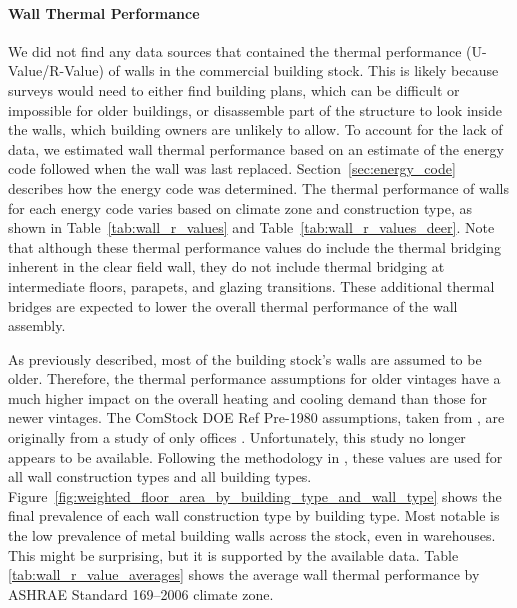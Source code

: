 \paragraph{Wall Thermal Performance}
We did not find any data sources that contained the thermal performance (U-Value/R-Value) of walls in the commercial building stock. This is likely because surveys would need to either find building plans, which can be difficult or impossible for older buildings, or disassemble part of the structure to look inside the walls, which building owners are unlikely to allow. To account for the lack of data, we estimated wall thermal performance based on an estimate of the energy code followed when the wall was last replaced. Section~\ref{sec:energy_code} describes how the energy code was determined. The thermal performance of walls for each energy code varies based on climate zone and construction type, as shown in Table~\ref{tab:wall_r_values} and Table~\ref{tab:wall_r_values_deer}. Note that although these thermal performance values do include the thermal bridging inherent in the clear field wall, they do not include thermal bridging at intermediate floors, parapets, and glazing transitions. These additional thermal bridges are expected to lower the overall thermal performance of the wall assembly.

As previously described, most of the building stock's walls are assumed to be older. Therefore, the thermal performance assumptions for older vintages have a much higher impact on the overall heating and cooling demand than those for newer vintages. The ComStock DOE Ref Pre-1980 assumptions, taken from \cite{doe_reference_buildings}, are originally from a study of only offices \citep{old_vintage_office_study}. Unfortunately, this study no longer appears to be available. Following the methodology in \cite{doe_reference_buildings}, these values are used for all wall construction types and all building types. Figure~\ref{fig:weighted_floor_area_by_building_type_and_wall_type} shows the final prevalence of each wall construction type by building type. Most notable is the low prevalence of metal building walls across the stock, even in warehouses. This might be surprising, but it is supported by the available data. Table \ref{tab:wall_r_value_averages} shows the average wall thermal performance by ASHRAE Standard 169--2006 climate zone.

%

%

